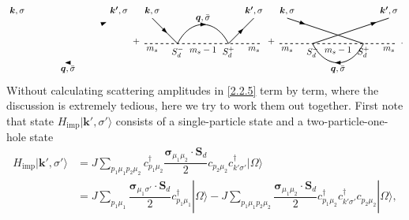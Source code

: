 \documentclass[aps,prx,superscriptaddress,onecolumn,preprintnumbers,nofootinbib,longbibliography]{revtex4-1}
\def\imp{\text{imp}}
\def\arrow{\tikz[scale=0.1,baseline=.1ex]{
	\draw[fill=black,rotate=-90] (-0.7,0)--(0,2)--(0.7,0);}
	}
\begin{document}
\begin{align}
\begin{tikzpicture}[baseline]
				\node[rotate=180] at (0,-0.75) {\arrow};
				\node at (0,-1) {$\bm{q},\bar\sigma$};
				\node[above] at (-2,1) {$\bm{k},\sigma$};
				\node[above] at (2,1) {$\bm{k'},\sigma$};
				\node[rotate=20] at (1.4,0.8) {\arrow};
			\end{tikzpicture}+
			\begin{tikzpicture}[baseline]
				\draw[thick,dashed] (-2.3,0)--(2.3,0);
				\draw[thick] (-2,1)--(-1,0) .. controls (-0.5,1) and (0.5,1) ..(1,0)--(2,1);
				\node[below] at (-2,0) {$m_s$};
				\node[below] at (0,0) {$m_s-1$};
				\node[below] at (2,0) {$m_s$};
				\node[below] at (1,0) {$S_d^+$};
				\node[below] at (-1,0) {$S_d^-$};
				\node[rotate=-45] at (-1.5,0.5) {\arrow};
				\node at (0,0.75) {\arrow};
				\node at (0,1) {$\bm{q},\bar{\sigma}$};
				\node[above] at (-2,1) {$\bm{k},\sigma$};
				\node[above] at (2,1) {$\bm{k'},\sigma$};
				\node[rotate=45] at (1.5,0.5) {\arrow};
			\end{tikzpicture}+
			\begin{tikzpicture}[baseline]
				\draw[thick,dashed] (-2.3,0)--(2.3,0);
				\draw[thick] (-2,1)--(1,0) .. controls (0.5,-1) and (-0.5,-1) .. (-1,0)--(2,1);
				\node[below] at (-2,0) {$m_s$};
				\node[below] at (0,0) {$m_s-1$};
				\node[below] at (2,0) {$m_s$};
				\node[below] at (1,0) {$S_d^+$};
				\node[below] at (-1,0) {$S_d^-$};
				\node[rotate=-20] at (-1.4,0.8) {\arrow};
				\node[rotate=180] at (0,-0.75) {\arrow};
				\node at (0,-1) {$\bm{q},\bar\sigma$};
				\node[above] at (-2,1) {$\bm{k},\sigma$};
				\node[above] at (2,1) {$\bm{k'},\sigma$};
				\node[rotate=20] at (1.4,0.8) {\arrow};
			\end{tikzpicture}.\label{2.2.5}
		\end{align}
\iffalse
		Without calculating scattering amplitudes in \eqref{2.2.5} term by term, where the discussion is extremely tedious, here we try to work them out together. First note that state $H_\imp|\bm{k'},\sigma'\rangle$ consists of a single-particle state and a two-particle-one-hole state
		\begin{align}\label{2.2.6}
			H_\imp|\bm{k'},\sigma'\rangle&=J\sum_{p_1\mu_1p_2\mu_2}c_{p_1\mu_2}^\dagger\dfrac{\bm{\sigma}_{\mu_1\mu_2}\cdot\bm{S}_d}{2}c_{p_2\mu_2}c_{k'\sigma'}^\dagger|\Omega\rangle\nonumber\\
			&=J\sum_{p_1\mu_1}\dfrac{\bm{\sigma}_{\mu_1\sigma'}\cdot\bm{S}_d}{2}c_{p_1\mu_1}^\dagger|\Omega\rangle-J\sum_{p_1\mu_1p_2\mu_2}\dfrac{\bm{\sigma}_{\mu_1\mu_2}\cdot\bm{S}_d}{2}c_{p_1\mu_2}^\dagger c_{k'\sigma'}^\dagger c_{p_2\mu_2}|\Omega\rangle,
		\end{align}
\end{document}
